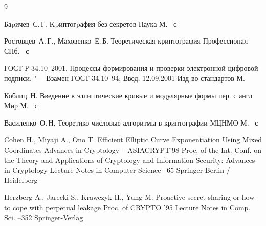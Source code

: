 \begin{thebibliography}{9}

\by Баpичев~С.\,Г.
\book Kpиптогpафия без секретов
\publ Наука
\publaddr М.
~с

\by Ростовцев~А.\,Г., Маховенко~Е.\,Б.
\book Теоретическая криптография
\publ Профессионал
\publaddr СПб.
~с

\book ГОСТ Р 34.10--2001. Процессы формирования и проверки электронной цифровой подписи. "--- Взамен ГОСТ
34.10--94; Введ. 12.09.2001
\publ Изд-во стандартов
\publaddr М.

\by Коблиц~Н.
\book Введение в эллиптические кривые и модулярные формы
\bookinfo пер. с англ
\publ Мир
\publaddr М.
~с

\by Василенко~О.\,Н.
\book Теоретико числовые алгоритмы в криптографии
\publ МЦНМО
\publaddr М.
~с

\by Cohen H.,  Miyaji A., Ono T.
\paper Efficient Elliptic Curve Exponentiation Using Mixed Coordinates
\inbook Advances in Cryptology -- ASIACRYPT'98
\bookinfo Proc. of the Int. Conf. on the Theory and Applications of Cryptology and Information Security: Advances in Cryptology
\serial Lecture Notes in Computer Science
--65
\publ Springer
\publaddr Berlin / Heidelberg

\by Herzberg A., Jarecki S., Krawczyk H., Yung M.
\paper Proactive secret sharing or how to cope with perpetual leakage
\inbook Proc. of CRYPTO '95
\bookinfo Lecture Notes in Comp. Sci.
--352
\publ Springer-Verlag

\end{thebibliography}




\newpage


\makeengtitlem



% 
